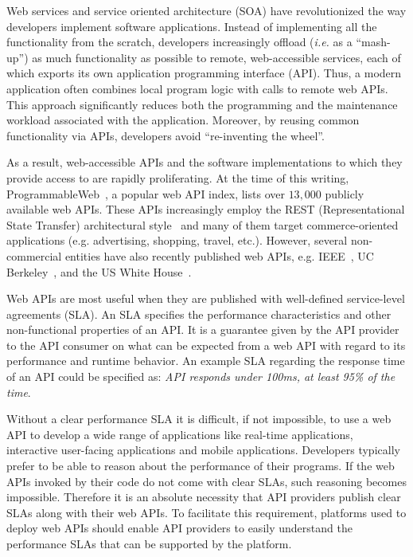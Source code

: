 Web services and service oriented architecture (SOA) have
revolutionized the way developers implement software applications.
Instead of implementing all the functionality from the scratch, developers
increasingly offload ({\em i.e.} as a ``mash-up'') as much functionality 
as possible to remote,
web-accessible services, each of which exports its own application programming
interface (API). Thus, a modern application often combines local program logic
with calls to remote web APIs.
This approach significantly reduces both the programming and
the maintenance workload associated with the application.
Moreover, by reusing common functionality via APIs, developers avoid ``re-inventing the
wheel''.

As a result, web-accessible APIs and the software implementations to which
they provide access to are rapidly proliferating.
At the time of this writing, 
ProgrammableWeb~\cite{pweb}, a popular web API index, lists over $13,000$
publicly available web APIs.
These APIs increasingly employ the REST (Representational State Transfer) architectural style~\cite{Fielding:2000:ASD:932295} and 
many of them target commerce-oriented applications (e.g. advertising, shopping, travel, etc.).
However, several non-commercial entities have also recently published web 
APIs, e.g. IEEE~\cite{ieeeapis}, UC Berkeley~\cite{ucbapis}, and the US White
House~\cite{whitehouseapis}. 

Web APIs are most useful when they are published with well-defined service-level agreements (SLA). 
An SLA specifies the performance characteristics and other non-functional 
properties of an API. It is a guarantee given by the API provider to the API consumer on what can be
expected from a web API with regard to its performance and runtime behavior. An example SLA regarding
the response time of an API could be specified as: \textit{API responds under 100ms, at least 95\% of the time}.

Without a clear performance SLA it is difficult, if not impossible,
to use a web API to develop a wide range of applications like real-time applications, interactive
user-facing applications and mobile applications.
Developers typically prefer to be able to reason about
the performance of their programs. If the web APIs invoked by their code do
not come with clear SLAs, such reasoning becomes impossible. Therefore it is an absolute
necessity that API providers publish clear SLAs along with their web APIs. To
facilitate this requirement, platforms used to deploy web APIs should enable API providers to 
easily understand the performance SLAs that can be supported by the platform.

